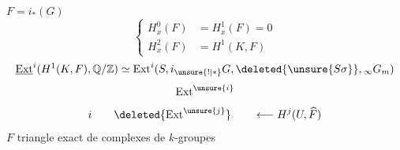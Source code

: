 $F=i_*(G)$
\[
\left\{\begin{aligned}
H^0_x(F)&=H^1_x(F)=0\\
H^2_x(F)&=H^1(K,F)
\end{aligned}\right.
\]
\[
\underline{\operatorname{Ext}}^i(H^1(K,F),\mathbb Q/\mathbb Z)\simeq
\operatorname{Ext}^i(S,i_{\unsure{!|*}}G,\deleted{\unsure{S\sigma}},{}_\infty G_m)
\]
\[
\operatorname{Ext}^{\unsure{i}}
\]
\[
i\qquad\deleted{\operatorname{Ext}^{\unsure{j}}}\qquad\longleftarrow H^j(U,\widehat F)
\]
$F$
triangle exact de complexes de $k$-groupes

